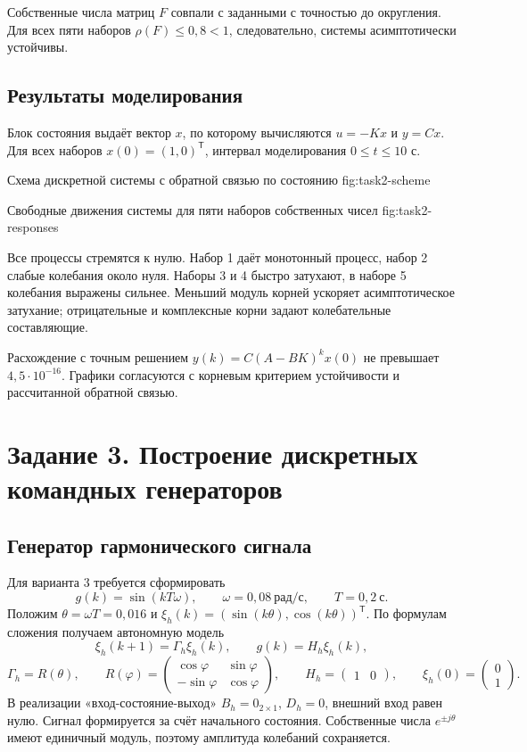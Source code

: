 Собственные числа матриц $F$ совпали с заданными с точностью
до округления. Для всех пяти наборов $\rho(F)\leq0{,}8<1$,
следовательно, системы асимптотически устойчивы.

\subsection{Результаты моделирования}

Блок состояния выдаёт вектор $x$, по которому вычисляются $u=-Kx$
и $y=Cx$. Для всех наборов $x(0)=(1,0)^{\mathsf T}$,
интервал моделирования $0\leq t\leq10$ с.

  {Схема дискретной системы с обратной связью по состоянию}
  {fig:task2-scheme}

  {Свободные движения системы для пяти наборов собственных чисел}
  {fig:task2-responses}

Все процессы стремятся к нулю. Набор 1 даёт монотонный процесс,
набор 2 \textemdash{} слабые колебания около нуля. Наборы 3 и 4
быстро затухают, в наборе 5 колебания выражены сильнее.
Меньший модуль корней ускоряет асимптотическое затухание;
отрицательные и комплексные корни задают колебательные составляющие.

Расхождение с точным решением $y(k)=C(A-BK)^k x(0)$
не превышает $4{,}5\cdot10^{-16}$. Графики согласуются
с корневым критерием устойчивости и рассчитанной обратной связью.

\clearpage
\section{Задание 3. Построение дискретных командных генераторов}

\subsection{Генератор гармонического сигнала}

Для варианта 3 требуется сформировать
\[
  g(k)=\sin(kT\omega),\qquad
  \omega=0{,}08\ \text{рад/с},\qquad T=0{,}2\ \text{с}.
\]
Положим $\theta=\omega T=0{,}016$ и
$\xi_h(k)=(\sin(k\theta),\cos(k\theta))^{\mathsf T}$.
По формулам сложения получаем автономную модель
\[
  \xi_h(k+1)=\Gamma_h\xi_h(k),\qquad g(k)=H_h\xi_h(k),
\]
\[
  \Gamma_h=R(\theta),\qquad
  R(\varphi)=
  \begin{pmatrix}
    \cos\varphi&\sin\varphi\\
    -\sin\varphi&\cos\varphi
  \end{pmatrix},\qquad
  H_h=\begin{pmatrix}1&0\end{pmatrix},\qquad
  \xi_h(0)=\begin{pmatrix}0\\1\end{pmatrix}.
\]
В реализации «вход-состояние-выход» $B_h=0_{2\times1}$, $D_h=0$,
внешний вход равен нулю. Сигнал формируется за счёт начального состояния.
Собственные числа $e^{\pm j\theta}$ имеют единичный модуль,
поэтому амплитуда колебаний сохраняется.

